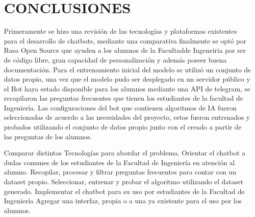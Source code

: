 \chapter[CONCLUSIONES]{CONCLUSIONES}

Primeramente se hizo una revisión de las tecnologías y plataformas existentes para el desarrollo de chatbots,
mediante una comparativa finalmente se optó por Rasa Open Source 
 que ayuden a los alumnos de la Facultadde Ingeneiria
por ser de código libre, 
gran capacidad de personalización y además poseer buena documentación.
Para el entrenamiento inicial del modelo se utilizó un conjunto de datos propio, una vez que el modelo pudo ser desplegado en un servidor público
y el Bot haya estado disponible para los alumnos mediante una API de telegram, se recopilaron las preguntas frecuentes que tienen los estudiantes de la facultad de Ingeniería.
Las configuraciones del bot que contienen algoritmos de IA fueron seleccionadas de acuerdo a las necesidades del proyecto, estos fueron
entrenados y probados utilizando el conjunto de datos propio junto con el creado a partir de las preguntas de los alumnos.

Comparar distintas Tecnologías para abordar el problema.
Orientar el chatbot a dudas comunes de los estudiantes de la Facultad de Ingeniería en
atención al alumno.
Recopilar, procesar y filtrar preguntas frecuentes para contar con un dataset propio.
Seleccionar, entrenar y probar el algoritmo utilizando el dataset generado.
Implementar el chatbot para su uso por estudiantes de la Facultad de Ingeniería
Agregar una interfaz, propia o a una ya existente para el uso por los alumnos.